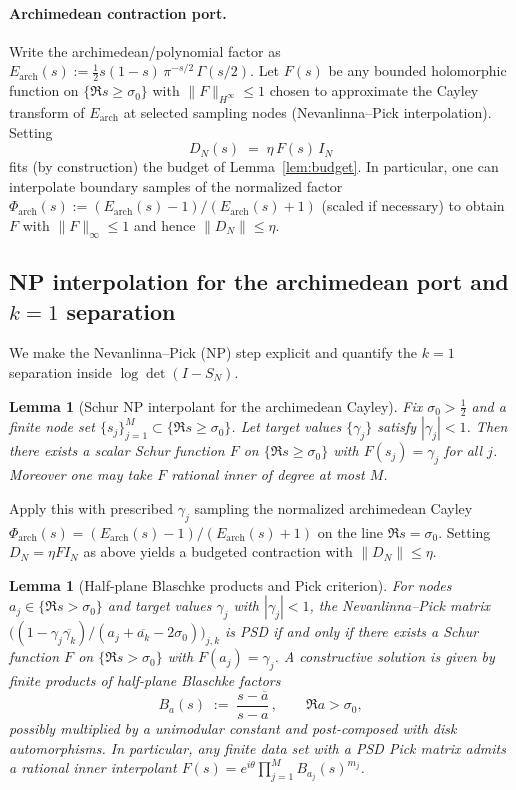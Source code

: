 \documentclass[11pt]{article}
\newtheorem{lemma}[theorem]{Lemma}
\theoremstyle{remark}
\begin{document}
\paragraph{Archimedean contraction port.}
Write the archimedean/polynomial factor as $E_{\mathrm{arch}}(s):=\tfrac12 s(1-s)\,\pi^{-s/2}\,\Gamma(s/2)$. Let $F(s)$ be any bounded holomorphic function on $\{\Re s\ge \sigma_0\}$ with $\|F\|_{H^\infty}\le 1$ chosen to approximate the Cayley transform of $E_{\mathrm{arch}}$ at selected sampling nodes (Nevanlinna--Pick interpolation). Setting
\[
 D_N(s)\;=\;\eta\,F(s)\,I_N
\]
fits (by construction) the budget of Lemma~\ref{lem:budget}. In particular, one can interpolate boundary samples of the normalized factor $\Phi_{\mathrm{arch}}(s):=(E_{\mathrm{arch}}(s)-1)/(E_{\mathrm{arch}}(s)+1)$ (scaled if necessary) to obtain $F$ with $\|F\|_\infty\le 1$ and hence $\|D_N\|\le \eta$.

\subsection{NP interpolation for the archimedean port and $k=1$ separation}\label{subsec:NP-arch}
We make the Nevanlinna--Pick (NP) step explicit and quantify the $k=1$ separation inside $\log\det(I-S_N)$.

\begin{lemma}[Schur NP interpolant for the archimedean Cayley]
Fix $\sigma_0>\tfrac12$ and a finite node set $\{s_j\}_{j=1}^{M}\subset\{\Re s\ge \sigma_0\}$. Let target values $\{\gamma_j\}$ satisfy $|\gamma_j|<1$. Then there exists a scalar Schur function $F$ on $\{\Re s\ge \sigma_0\}$ with $F(s_j)=\gamma_j$ for all $j$. Moreover one may take $F$ rational inner of degree at most $M$.
\end{lemma}

Apply this with prescribed $\gamma_j$ sampling the normalized archimedean Cayley $\Phi_{\mathrm{arch}}(s)=(E_{\mathrm{arch}}(s)-1)/(E_{\mathrm{arch}}(s)+1)$ on the line $\Re s=\sigma_0$. Setting $D_N=\eta F I_N$ as above yields a budgeted contraction with $\|D_N\|\le \eta$.

\begin{lemma}[Half-plane Blaschke products and Pick criterion]\label{lem:halfplane-blaschke}
For nodes $a_j\in\{\Re s>\sigma_0\}$ and target values $\gamma_j$ with $|\gamma_j|<1$, the Nevanlinna--Pick matrix $\big((1-\gamma_j\overline{\gamma_k})/(a_j+\overline{a_k}-2\sigma_0)\big)_{j,k}$ is PSD if and only if there exists a Schur function $F$ on $\{\Re s>\sigma_0\}$ with $F(a_j)=\gamma_j$. A constructive solution is given by finite products of half-plane Blaschke factors
\[
 B_{a}(s)\;:=\;\frac{s-\overline a}{s-a}\,,\qquad \Re a>\sigma_0,
\]
possibly multiplied by a unimodular constant and post-composed with disk automorphisms. In particular, any finite data set with a PSD Pick matrix admits a rational inner interpolant $F(s)=e^{i\theta}\prod_{j=1}^{M} B_{a_j}(s)^{m_j}$.
\end{lemma}
\end{document}
